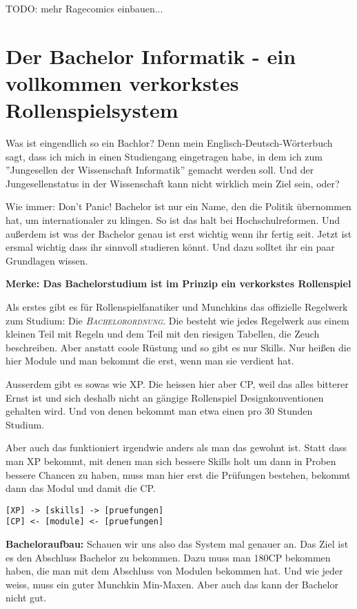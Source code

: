 TODO: mehr Ragecomics einbauen...

\section*{Der Bachelor Informatik - ein vollkommen verkorkstes Rollenspielsystem}
Was ist eingendlich so ein Bachlor? Denn mein Englisch-Deutsch-W\"orterbuch
sagt, dass ich mich in einen Studiengang eingetragen habe, in dem ich zum
''Jungesellen der Wissenschaft Informatik'' gemacht werden soll. Und der
Jungesellenstatus in der Wissenschaft kann nicht wirklich mein Ziel sein, oder?

Wie immer: Don't Panic! Bachelor ist nur ein Name, den die Politik \"ubernommen
hat, um internationaler zu klingen.  So ist das halt bei Hochschulreformen. Und
au{\ss}erdem ist was der Bachelor genau ist erst wichtig wenn ihr fertig seit.
Jetzt ist ersmal wichtig dass ihr sinnvoll studieren k\"onnt. Und dazu solltet
ihr ein paar Grundlagen wissen.

\textbf{Merke: Das Bachelorstudium ist im Prinzip ein verkorkstes Rollenspiel}

Als erstes gibt es f\"ur Rollenspielfanatiker und Munchkins das offizielle
Regelwerk zum Studium: Die \textsc{\textit{Bachelorordnung}}. Die besteht wie jedes
Regelwerk aus einem kleinen Teil mit Regeln
und dem Teil mit den riesigen
Tabellen, die Zeuch beschreiben. Aber anstatt coole R\"ustung und so gibt es
nur Skills. Nur hei{\ss}en die hier Module und man bekommt die erst, wenn man sie
verdient hat.

Ausserdem gibt es sowas wie XP. Die heissen hier aber CP, weil das alles
bitterer Ernst ist und sich deshalb nicht an g\"angige Rollenspiel
Designkonventionen gehalten wird. Und von denen bekommt man etwa einen pro 30
Stunden Studium.

Aber auch das funktioniert irgendwie anders als man das gewohnt ist. Statt dass
man XP bekommt, mit denen man sich bessere Skills holt um dann in Proben
bessere Chancen zu haben, muss man hier erst die Pr\"ufungen bestehen, bekommt
dann das Modul und damit die CP.
{\large
\begin{verbatim}
[XP] -> [skills] -> [pruefungen]
[CP] <- [module] <- [pruefungen]
\end{verbatim}}


\textbf{Bacheloraufbau:}
Schauen wir uns also das System mal genauer an.
Das Ziel ist es den Abschluss Bachelor zu bekommen. Dazu muss man 180CP
bekommen haben, die man mit dem Abschluss von Modulen bekommen hat. Und wie
jeder weiss, muss ein guter Munchkin Min-Maxen. Aber auch das kann der Bachelor
nicht gut.


